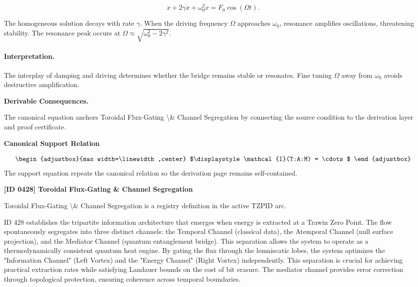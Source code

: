 \begin{equation}
\ddot{x} + 2\gamma\dot{x} + \omega_0^2 x = F_0\cos(\Omega t).
\end{equation}

The homogeneous solution decays with rate $\gamma$.  When the driving frequency $\Omega$ approaches $\omega_0$, resonance amplifies oscillations, threatening stability.
The resonance peak occurs at $\Omega \approx \sqrt{\omega_0^2 - 2\gamma^2}$.

\paragraph{Interpretation.}

The interplay of damping and driving determines whether the bridge remains stable or resonates.  Fine tuning $\Omega$ away from $\omega_0$ avoids destructive amplification.

\par\vspace{0.35em}
\noindent\textbf{Derivable Consequences.}\quad
\begingroup
\footnotesize
\raggedright
The canonical equation anchors Toroidal Flux-Gating \textbackslash{}\& Channel Segregation by connecting the source condition to the derivation layer and proof certificate.
\par\endgroup

\noindent\textbf{Canonical Support Relation}\par
\[
\begin{adjustbox}{max width=\linewidth,center}
$\displaystyle
\mathcal{I}(T:A:M) = \cdots
$
\end{adjustbox}
\]
\noindent The support equation repeats the canonical relation so the derivation page remains self-contained.\par

\clearpage
\noindent\textbf{[ID 0428] Toroidal Flux-Gating \& Channel Segregation}\par
\vspace{0.35em}
\begingroup\small
{}
Toroidal Flux-Gating \textbackslash{}\& Channel Segregation is a registry definition in the active TZPID arc.

ID 428 establishes the tripartite information architecture that emerges when energy is extracted at a Trawin Zero Point. The flow spontaneously segregates into three distinct channels: the Temporal Channel (classical data), the Atemporal Channel (null surface projection), and the Mediator Channel (quantum entanglement bridge). This separation allows the system to operate as a thermodynamically consistent quantum heat engine. By gating the flux through the lemniscatic lobes, the system optimizes the "Information Channel" (Left Vortex) and the "Energy Channel" (Right Vortex) independently. This separation is crucial for achieving practical extraction rates while satisfying Landauer bounds on the cost of bit erasure. The mediator channel provides error correction through topological protection, ensuring coherence across temporal boundaries.

